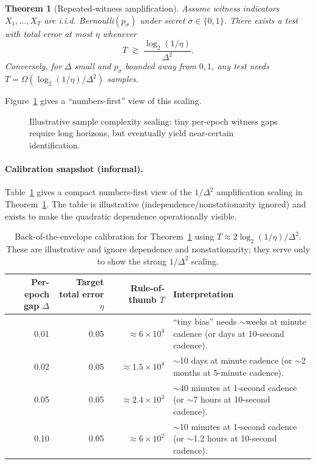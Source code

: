 \documentclass[11pt]{article}
\newtheorem{theorem}{Theorem}
\begin{document}
\begin{theorem}[Repeated-witness amplification]
\label{thm:repeat-witness}
Assume witness indicators $X_1,\dots,X_T$ are i.i.d. Bernoulli$(p_\sigma)$ under secret $\sigma\in\{0,1\}$.
There exists a test with total error at most $\eta$ whenever
\[
T \;\gtrsim\; \frac{\log_2(1/\eta)}{\Delta^2}.
\]
Conversely, for $\Delta$ small and $p_\sigma$ bounded away from $0,1$, any test needs $T=\Omega(\log_2(1/\eta)/\Delta^2)$ samples.
\end{theorem}

Figure~\ref{fig:eps-to-samples} gives a ``numbers-first'' view of this scaling.

\begin{figure}[t]
  \centering
  \caption{Illustrative sample complexity scaling: tiny per-epoch witness gaps require long horizons, but eventually yield near-certain identification.
  }
  \label{fig:eps-to-samples}
\end{figure}

\paragraph{Calibration snapshot (informal).}
Table~\ref{tab:calibration} gives a compact numbers-first view of the $1/\Delta^2$ amplification scaling in Theorem~\ref{thm:repeat-witness}.
The table is illustrative (independence/nonstationarity ignored) and exists to make the quadratic dependence operationally visible.

\begin{table}[h]
\centering
\footnotesize
\setlength{\tabcolsep}{4pt}
\begin{tabularx}{\linewidth}{@{}r r r >{\raggedright\arraybackslash}X@{}}
\toprule
Per-epoch gap $\Delta$ & Target total error $\eta$ & Rule-of-thumb $T$ & Interpretation \\
\midrule
0.01 & 0.05 & $\approx 6\times 10^4$ & ``tiny bias'' needs $\sim$weeks at minute cadence (or days at 10-second cadence). \\
0.02 & 0.05 & $\approx 1.5\times 10^4$ & $\sim$10 days at minute cadence (or $\sim$2 months at 5-minute cadence). \\
0.05 & 0.05 & $\approx 2.4\times 10^3$ & $\sim$40 minutes at 1-second cadence (or $\sim$7 hours at 10-second cadence). \\
0.10 & 0.05 & $\approx 6\times 10^2$ & $\sim$10 minutes at 1-second cadence (or $\sim$1.2 hours at 10-second cadence). \\
\bottomrule
\end{tabularx}
\normalsize
\caption{Back-of-the-envelope calibration for Theorem~\ref{thm:repeat-witness} using $T\approx 2\log_2(1/\eta)/\Delta^2$.
These are illustrative and ignore dependence and nonstationarity; they serve only to show the strong $1/\Delta^2$ scaling.
}
\label{tab:calibration}
\end{table}
\end{document}
